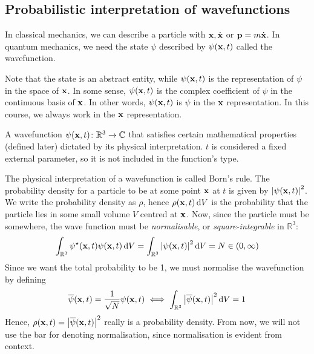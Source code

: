\subsection{Probabilistic interpretation of wavefunctions}
In classical mechanics, we can describe a particle with \( \vb x, \dot{\vb x} \) or \( \vb p = m \dot{\vb x} \).
In quantum mechanics, we need the state \( \psi \) described by \( \psi(\vb x, t) \) called the wavefunction.
\begin{remark}
	Note that the state is an abstract entity, while \( \psi(\vb x, t) \) is the representation of \( \psi \) in the space of \( \vb x \).
	In some sense, \( \psi(\vb x, t) \) is the complex coefficient of \( \psi \) in the continuous basis of \( \vb x \).
	In other words, \( \psi(\vb x, t) \) is \( \psi \) in the \( \vb x \) representation.
	In this course, we always work in the \( \vb x \) representation.
\end{remark}
\begin{definition}
	A wavefunction \( \psi(\vb x, t) \colon \mathbb R^3 \to \mathbb C \) that satisfies certain mathematical properties (defined later) dictated by its physical interpretation.
	\( t \) is considered a fixed external parameter, so it is not included in the function's type.
\end{definition}
The physical interpretation of a wavefunction is called Born's rule.
The probability density for a particle to be at some point \( \vb x \) at \( t \) is given by \( \abs{\psi(\vb x, t)}^2 \).
We write the probability density as \( \rho \), hence \( \rho(\vb x, t) \dd{V} \) is the probability that the particle lies in some small volume \( V \) centred at \( \vb x \).
Now, since the particle must be somewhere, the wave function must be \textit{normalisable}, or \textit{square-integrable} in \( \mathbb R^3 \):
\[
	\int_{\mathbb R^3} \psi^\star(\vb x, t) \psi(\vb x, t) \dd{V} = \int_{\mathbb R^3} \abs{\psi(\vb x, t)}^2 \dd{V} = N \in (0, \infty)
\]
Since we want the total probability to be 1, we must normalise the wavefunction by defining
\[
	\overline{\psi}(\vb x, t) = \frac{1}{\sqrt{N}} \psi(\vb x, t) \iff \int_{\mathbb R^3} \abs{\overline{\psi}(\vb x, t)}^2 \dd{V} = 1
\]
Hence, \( \rho(\vb x,t) = \abs{\overline{\psi}(\vb x,t)}^2 \) really is a probability density.
From now, we will not use the bar for denoting normalisation, since normalisation is evident from context.

